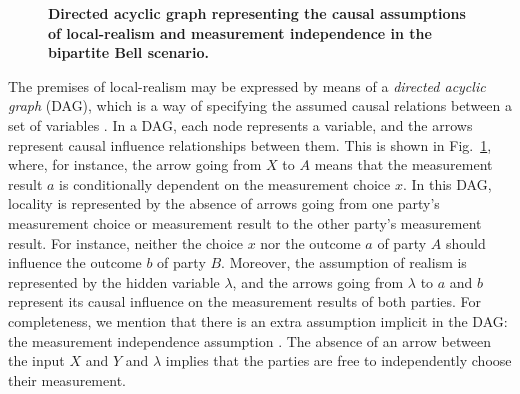 \documentclass[aps,pra,reprint, superscriptaddress,showkeys]{revtex4-2}
\theoremstyle{plain}
\begin{document}
\begin{figure}[h!]
\centering
{}
\caption{\justifying \textbf{Directed acyclic graph representing the causal assumptions of local-realism and measurement independence in the bipartite Bell scenario.}}
\label{fig:localcausal}
\end{figure}


The premises of local-realism may be expressed by means of a \textit{directed acyclic graph} (DAG), which is a way of specifying the assumed causal relations between a set of variables \cite{Pearl2009causality, Wood_2015, chaves2015}. In a DAG, each node represents a variable, and the arrows represent causal influence relationships between them. This is shown in Fig.~\ref{fig:localcausal}, where, for instance, the arrow going from $X$ to $A$ means that the measurement result $a$ is conditionally dependent on the measurement choice $x$. In this DAG, locality is represented by the absence of arrows going from one party's measurement choice or measurement result to the other party's measurement result. For instance, neither the choice $x$ nor the outcome $a$ of party $A$ should influence the outcome $b$ of party $B$. Moreover, the assumption of realism is represented by the hidden variable $\lambda$, and the arrows going from \(\lambda\) to $a$ and $b$ represent its causal influence on the measurement results of both parties. For completeness, we mention that there is an extra assumption implicit in the DAG: the measurement independence assumption \cite{hall2010local,barrett2011much,hall2011relaxed,putz2014arbitrarily,chaves2015,chaves2021causal,vieira2025test,BigBellTest2018,Handsteiner2017,scheidl2010violation}. The absence of an arrow between the input $X$ and $Y$ and $\lambda$ implies that the parties are free to independently choose their measurement. 
\end{document}
